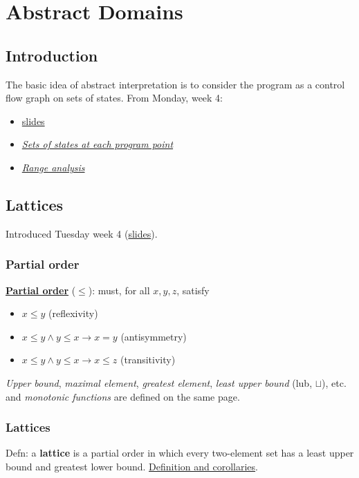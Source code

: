 \documentclass[a4paper,10pt]{article}
\begin{document}
\label{abstrinterp}
\section{Abstract Domains} 
\subsection{Introduction}
The basic idea of abstract interpretation is to consider the program as a
control flow graph on sets of states. From Monday, week 4:
\begin{itemize}
\item
\href{http://lara.epfl.ch/w/_media/sav12:lecture8.pdf?cache=cache}{slides}
\item
\href{http://lara.epfl.ch/w/cc09:sets_of_states_at_each_program_point}
{\emph{Sets of states at each program point}}
\item \href{http://lara.epfl.ch/w/cc09:range_analysis_example}
{\emph{Range analysis}} 
\end{itemize}

\subsection{Lattices} 
Introduced Tuesday week 4
(\href{http://lara.epfl.ch/w/_media/sav12:lecture9.pdf?cache=cache}{slides}).

\subsubsection{Partial order}
\href{http://lara.epfl.ch/w/partial_order}{\textbf{Partial order}}
($≤$): must, for all $x,y,z$, satisfy
\begin{itemize}
 \item $x≤y$ (reflexivity)
 \item $x≤y \land y≤x \rightarrow x=y$ (antisymmetry)
 \item $x≤y \land y≤x \rightarrow x≤z$ (transitivity)
\end{itemize}
\emph{Upper bound}, \emph{maximal element}, \emph{greatest element},
\emph{least upper bound} (lub, $\sqcup$), etc. and \emph{monotonic
functions} are defined on the same page.

\subsubsection{Lattices}
Defn: a \textbf{lattice} is a partial order in which every two-element set has
a least upper bound and greatest lower bound.
\href{http://lara.epfl.ch/w/sav08:lattices}{Definition and corollaries}.
\end{document}
